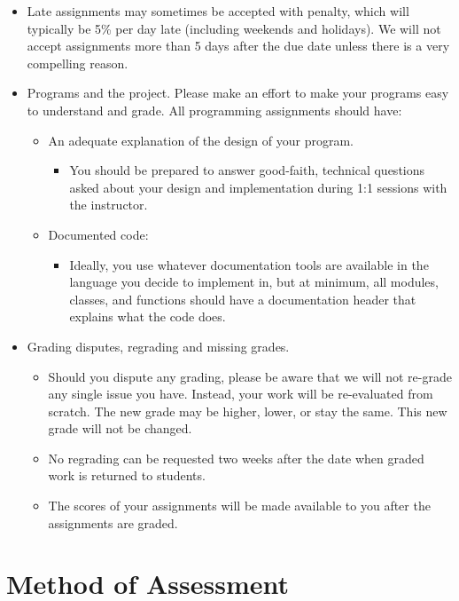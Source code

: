 \documentclass[11pt,article,oneside]{memoir} %
\begin{document}
\begin{itemize}
    \item Late assignments may sometimes be accepted with penalty, which will typically be 5\%
    per day late (including weekends and holidays). We will not accept assignments more
    than 5 days after the due date unless there is a very compelling reason.
    \item Programs and the project. Please make an effort to make your programs easy to
    understand and grade. All programming assignments should have:
    \begin{itemize}
        \item An adequate explanation of the design of your program.
        \begin{itemize}
            \item You should be prepared to answer good-faith, technical questions asked about
            your design and implementation during 1:1 sessions with the instructor.
        \end{itemize}
        \item Documented code:
        \begin{itemize}
            \item Ideally, you use whatever documentation tools are available in the language you
            decide to implement in, but at minimum, all modules, classes, and functions
            should have a documentation header that explains what the code does.
        \end{itemize}
    \end{itemize}
    \item Grading disputes, regrading and missing grades.
    \begin{itemize}
        \item Should you dispute any grading, please be aware that we will not re-grade any
single issue you have. Instead, your work will be re-evaluated from scratch. The
new grade may be higher, lower, or stay the same. This new grade will not be
changed.
        \item No regrading can be requested two weeks after the date when graded work is
        returned to students.
        \item The scores of your assignments will be made available to you after the
assignments are graded.
    \end{itemize}
\end{itemize}

\section{Method of Assessment}%
\end{document}
